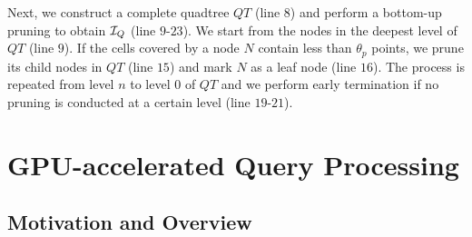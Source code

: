 \documentclass[10pt,conference,letterpaper]{IEEEtran}
\newcommand{\frname}{GAT\xspace }
\newcommand{\idxname}{GTIDX\xspace }
\newcommand{\trajtable}{{\cal S}\xspace}
\newcommand{\treeindex}{{{\cal I}_Q}\xspace}
\begin{document}

Next, we construct a complete quadtree $QT$ (line $8$) and perform a bottom-up pruning to obtain $\treeindex$ (line $9$-$23$). We start from the nodes in the deepest level of $QT$ (line $9$). If the cells covered by a node $N$ contain less than $\theta_p$ points, we prune its child nodes in $QT$ (line $15$) and mark $N$ as a leaf node (line $16$). The process is repeated from level $n$ to level $0$ of $QT$ and we perform early termination if no pruning is conducted at a certain level (line $19$-$21$).




\section{GPU-accelerated Query Processing}\label{sec:query}


\subsection{Motivation and Overview}
\end{document}
